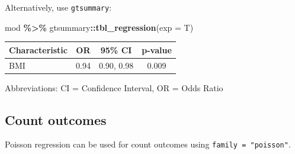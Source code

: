 \documentclass[
]{book}
\newenvironment{Shaded}{\begin{snugshade}}{\end{snugshade}}
\newcommand{\AttributeTok}[1]{\textcolor[rgb]{0.13,0.29,0.53}{#1}}
\newcommand{\DecValTok}[1]{\textcolor[rgb]{0.00,0.00,0.81}{#1}}
\newcommand{\FloatTok}[1]{\textcolor[rgb]{0.00,0.00,0.81}{#1}}
\newcommand{\FunctionTok}[1]{\textcolor[rgb]{0.13,0.29,0.53}{\textbf{#1}}}
\newcommand{\NormalTok}[1]{#1}
\newcommand{\OtherTok}[1]{\textcolor[rgb]{0.56,0.35,0.01}{#1}}
\newcommand{\SpecialCharTok}[1]{\textcolor[rgb]{0.81,0.36,0.00}{\textbf{#1}}}
\newcommand{\StringTok}[1]{\textcolor[rgb]{0.31,0.60,0.02}{#1}}
\begin{document}
Alternatively, use \texttt{gtsummary}:

\begin{Shaded}
\begin{Highlighting}[]
\NormalTok{mod }\SpecialCharTok{\%\textgreater{}\%}\NormalTok{ gtsummary}\SpecialCharTok{::}\FunctionTok{tbl\_regression}\NormalTok{(}\AttributeTok{exp =}\NormalTok{ T)}
\end{Highlighting}
\end{Shaded}

\begin{table}[t]
\fontsize{12.0pt}{14.0pt}\selectfont
\begin{tabular*}{\linewidth}{@{\extracolsep{\fill}}lccc}
\toprule
\textbf{Characteristic} & \textbf{OR} & \textbf{95\% CI} & \textbf{p-value} \\ 
\midrule\addlinespace[2.5pt]
BMI & 0.94 & 0.90, 0.98 & 0.009 \\ 
\bottomrule
\end{tabular*}
\begin{minipage}{\linewidth}
\vspace{.05em}
Abbreviations: CI = Confidence Interval, OR = Odds Ratio\\
\end{minipage}
\end{table}

\subsection{Count outcomes}\label{count-outcomes}

Poisson regression can be used for count outcomes using \texttt{family\ =\ "poisson"}.

\begin{Shaded}
\end{Shaded}
\end{document}
